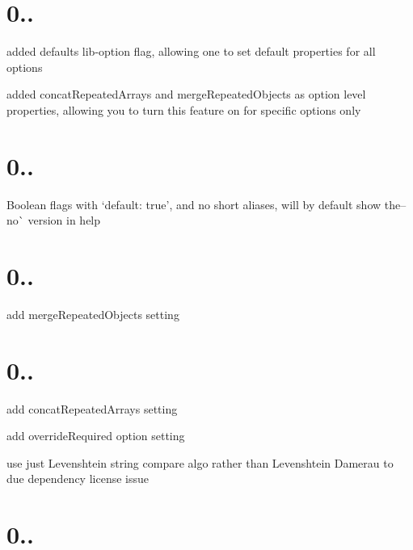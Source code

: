 \section*{0..}


\begin{DoxyItemize}
\item added {\ttfamily defaults} lib-\/option flag, allowing one to set default properties for all options
\item added {\ttfamily concat\+Repeated\+Arrays} and {\ttfamily merge\+Repeated\+Objects} as option level properties, allowing you to turn this feature on for specific options only
\end{DoxyItemize}

\section*{0..}


\begin{DoxyItemize}
\item {\ttfamily Boolean} flags with `default\+: \textquotesingle{}true'{\ttfamily , and no short aliases, will by default show the}--no\`{} version in help
\end{DoxyItemize}

\section*{0..}


\begin{DoxyItemize}
\item add {\ttfamily merge\+Repeated\+Objects} setting
\end{DoxyItemize}

\section*{0..}


\begin{DoxyItemize}
\item add {\ttfamily concat\+Repeated\+Arrays} setting
\item add {\ttfamily override\+Required} option setting
\item use just Levenshtein string compare algo rather than Levenshtein Damerau to due dependency license issue
\end{DoxyItemize}

\section*{0..}


